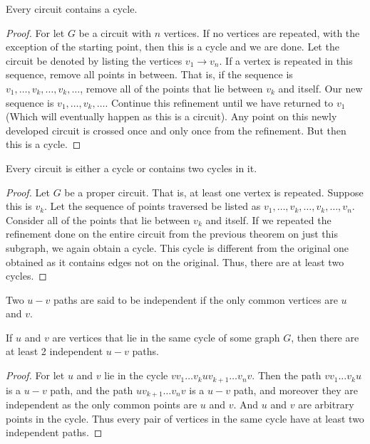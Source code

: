 \documentclass[crop=false,class=book,oneside]{standalone}
\begin{document}
\begin{theorem}
Every circuit contains a cycle.
\end{theorem}
\begin{proof}
For let $G$ be a circuit with $n$ vertices. If no vertices are repeated, with the exception of the starting point, then this is a cycle and we are done. Let the circuit be denoted by listing the vertices $v_1 \rightarrow v_n$. If a vertex is repeated in this sequence, remove all points in between. That is, if the sequence is $v_1,\hdots, v_k,\hdots, v_k, \hdots$, remove all of the points that lie between $v_k$ and itself. Our new sequence is $v_1, \hdots, v_k, \hdots$. Continue this refinement until we have returned to $v_1$ (Which will eventually happen as this is a circuit). Any point on this newly developed circuit is crossed once and only once from the refinement. But then this is a cycle.
\end{proof}
\begin{theorem}
Every circuit is either a cycle or contains two cycles in it.
\end{theorem}
\begin{proof}
Let $G$ be a proper circuit. That is, at least one vertex is repeated. Suppose this is $v_k$. Let the sequence of points traversed be listed as $v_1,\hdots, v_k, \hdots,v_k, \hdots, v_n$. Consider all of the points that lie between $v_k$ and itself. If we repeated the refinement done on the entire circuit from the previous theorem on just this subgraph, we again obtain a cycle. This cycle is different from the original one obtained as it contains edges not on the original. Thus, there are at least two cycles.
\end{proof}
\begin{definition}
Two $u-v$ paths are said to be independent if the only common vertices are $u$ and $v$.
\end{definition}
\begin{theorem}
If $u$ and $v$ are vertices that lie in the same cycle of some graph $G$, then there are at least 2 independent $u-v$ paths.
\end{theorem}
\begin{proof}
For let $u$ and $v$ lie in the cycle $vv_1 \hdots v_k u v_{k+1}\hdots v_n v$. Then the path $v v_1 \hdots v_k u$ is a $u-v$ path, and the path $u v_{k+1} \hdots v_n v$ is a $u-v$ path, and moreover they are independent as the only common points are $u$ and $v$. And $u$ and $v$ are arbitrary points in the cycle. Thus every pair of vertices in the same cycle have at least two independent paths.
\end{proof}
\end{document}

